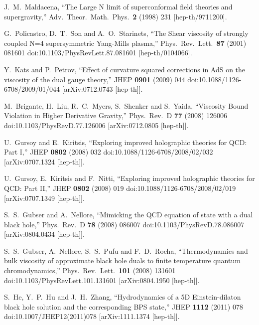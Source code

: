 \documentclass[11pt,epsf,letterpaper]{article}%
\begin{document}
\begin{thebibliography}{99}                                                                                               %


J.~M.~Maldacena, ``The Large N limit of
superconformal field theories and supergravity,''
Adv.\ Theor.\ Math.\ Phys.\ \textbf{2} (1998) 231 [hep-th/9711200].


G.~Policastro, D.~T.~Son and A.~O.~Starinets,
``The Shear viscosity of strongly coupled N=4 supersymmetric Yang-Mills
plasma,'' Phys.\ Rev.\ Lett.\ \textbf{87} (2001) 081601
doi:10.1103/PhysRevLett.87.081601 [hep-th/0104066].

Y.~Kats and P.~Petrov, ``Effect of curvature squared
corrections in AdS on the viscosity of the dual gauge theory,'' JHEP
\textbf{0901} (2009) 044 doi:10.1088/1126-6708/2009/01/044 [arXiv:0712.0743 [hep-th]].

M.~Brigante, H.~Liu, R.~C.~Myers, S.~Shenker and
S.~Yaida, ``Viscosity Bound Violation in Higher Derivative Gravity,''
Phys.\ Rev.\ D \textbf{77} (2008) 126006 doi:10.1103/PhysRevD.77.126006
[arXiv:0712.0805 [hep-th]].

U.~Gursoy and E.~Kiritsis, ``Exploring improved
holographic theories for QCD: Part I,'' JHEP \textbf{0802} (2008) 032
doi:10.1088/1126-6708/2008/02/032 [arXiv:0707.1324 [hep-th]].

U.~Gursoy, E.~Kiritsis and F.~Nitti, ``Exploring
improved holographic theories for QCD: Part II,'' JHEP \textbf{0802} (2008)
019 doi:10.1088/1126-6708/2008/02/019 [arXiv:0707.1349 [hep-th]].

S.~S.~Gubser and A.~Nellore, ``Mimicking the QCD
equation of state with a dual black hole,'' Phys.\ Rev.\ D \textbf{78} (2008)
086007 doi:10.1103/PhysRevD.78.086007 [arXiv:0804.0434 [hep-th]].


S.~S.~Gubser, A.~Nellore, S.~S.~Pufu and F.~D.~Rocha,
``Thermodynamics and bulk viscosity of approximate black hole duals to finite
temperature quantum chromodynamics,'' Phys.\ Rev.\ Lett.\ \textbf{101} (2008)
131601 doi:10.1103/PhysRevLett.101.131601 [arXiv:0804.1950 [hep-th]].

S.~He, Y.~P.~Hu and J.~H.~Zhang, ``Hydrodynamics of a 5D
Einstein-dilaton black hole solution and the corresponding BPS state,'' JHEP
\textbf{1112} (2011) 078 doi:10.1007/JHEP12(2011)078 [arXiv:1111.1374
[hep-th]].



\end{thebibliography}
\end{document}
